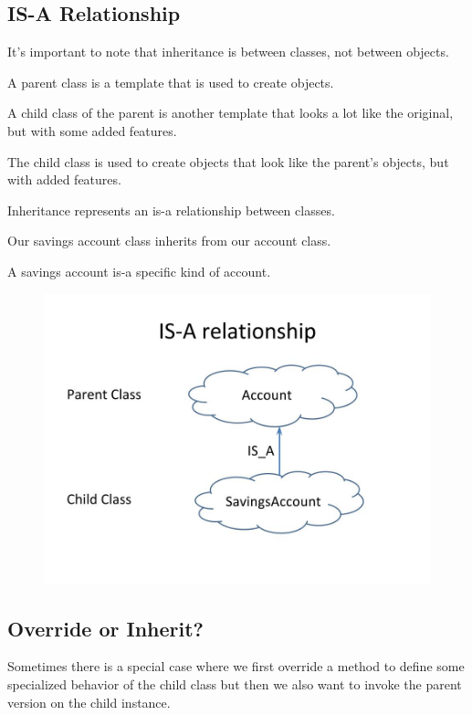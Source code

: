 \documentclass{article}
\begin{document}
\subsection{IS-A Relationship}

It's important to note that inheritance is between classes, not between objects.

A parent class is a template that is used to create objects. 

A child class of the parent is another template that looks a lot like the original, but with some added features. 

The child class is used to create objects that look like the parent's objects, but with added features.

Inheritance represents an is-a relationship between classes. 

Our savings account class inherits from our account class.

A savings account is-a specific kind of account.

\begin{figure}[h]
\includegraphics[scale=.35]{is-a_relationship}\\
\end{figure}

\subsection{Override or Inherit?}

Sometimes there is a special case where we first override a method to define some specialized  behavior of the child class but then we also want to invoke the parent version on the child instance. 
\end{document}
